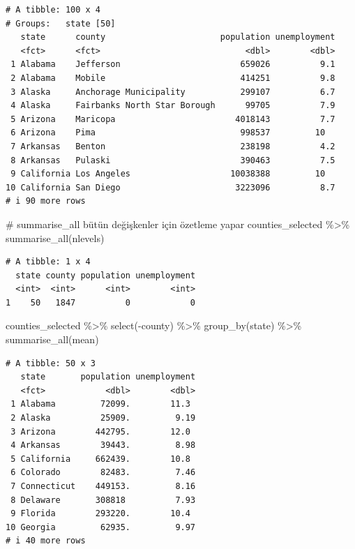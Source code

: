 \documentclass[
  letterpaper,
  DIV=11,
  numbers=noendperiod]{scrreprt}
\newenvironment{Shaded}{\begin{snugshade}}{\end{snugshade}}
\newcommand{\CommentTok}[1]{\textcolor[rgb]{0.37,0.37,0.37}{#1}}
\newcommand{\FunctionTok}[1]{\textcolor[rgb]{0.28,0.35,0.67}{#1}}
\newcommand{\NormalTok}[1]{\textcolor[rgb]{0.00,0.23,0.31}{#1}}
\newcommand{\SpecialCharTok}[1]{\textcolor[rgb]{0.37,0.37,0.37}{#1}}
\begin{document}
\begin{verbatim}
# A tibble: 100 x 4
# Groups:   state [50]
   state      county                       population unemployment
   <fct>      <fct>                             <dbl>        <dbl>
 1 Alabama    Jefferson                        659026          9.1
 2 Alabama    Mobile                           414251          9.8
 3 Alaska     Anchorage Municipality           299107          6.7
 4 Alaska     Fairbanks North Star Borough      99705          7.9
 5 Arizona    Maricopa                        4018143          7.7
 6 Arizona    Pima                             998537         10  
 7 Arkansas   Benton                           238198          4.2
 8 Arkansas   Pulaski                          390463          7.5
 9 California Los Angeles                    10038388         10  
10 California San Diego                       3223096          8.7
# i 90 more rows
\end{verbatim}

\begin{Shaded}
\begin{Highlighting}[]
\CommentTok{\# summarise\_all bütün değişkenler için özetleme yapar}
\NormalTok{counties\_selected }\SpecialCharTok{\%\textgreater{}\%} \FunctionTok{summarise\_all}\NormalTok{(nlevels)}
\end{Highlighting}
\end{Shaded}

\begin{verbatim}
# A tibble: 1 x 4
  state county population unemployment
  <int>  <int>      <int>        <int>
1    50   1847          0            0
\end{verbatim}

\begin{Shaded}
\begin{Highlighting}[]
\NormalTok{counties\_selected }\SpecialCharTok{\%\textgreater{}\%} 
  \FunctionTok{select}\NormalTok{(}\SpecialCharTok{{-}}\NormalTok{county) }\SpecialCharTok{\%\textgreater{}\%} 
  \FunctionTok{group\_by}\NormalTok{(state) }\SpecialCharTok{\%\textgreater{}\%} 
  \FunctionTok{summarise\_all}\NormalTok{(mean)}
\end{Highlighting}
\end{Shaded}

\begin{verbatim}
# A tibble: 50 x 3
   state       population unemployment
   <fct>            <dbl>        <dbl>
 1 Alabama         72099.        11.3 
 2 Alaska          25909.         9.19
 3 Arizona        442795.        12.0 
 4 Arkansas        39443.         8.98
 5 California     662439.        10.8 
 6 Colorado        82483.         7.46
 7 Connecticut    449153.         8.16
 8 Delaware       308818          7.93
 9 Florida        293220.        10.4 
10 Georgia         62935.         9.97
# i 40 more rows
\end{verbatim}
\end{document}
